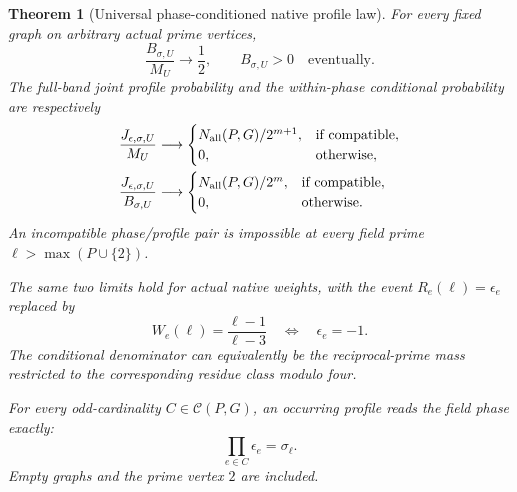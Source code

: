 \documentclass[11pt]{article}
\newtheorem{theorem}{Theorem}[section]
\begin{document}
\begin{theorem}[Universal phase-conditioned native profile law]
\label{thm:native-phase-profiles}
For every fixed graph on arbitrary actual prime vertices,
\[
 \frac{B_{\sigma,U}}{M_U}\longrightarrow\frac12,
 \qquad B_{\sigma,U}>0\quad\text{eventually}.
\]
The full-band joint profile probability and the within-phase
conditional probability are respectively
\begin{align}
 \frac{J_{\epsilon,\sigma,U}}{M_U}
 &\longrightarrow
 \begin{cases}
 N_{\rm all}(P,G)/2^{m+1},&\text{if compatible},\\
 0,&\text{otherwise},
 \end{cases}\label{eq:native-phase-joint}\\
 \frac{J_{\epsilon,\sigma,U}}{B_{\sigma,U}}
 &\longrightarrow
 \begin{cases}
 N_{\rm all}(P,G)/2^m,&\text{if compatible},\\
 0,&\text{otherwise}.
 \end{cases}\label{eq:native-phase-conditional}
\end{align}
An incompatible phase/profile pair is impossible at every field prime
\(\ell>\max(P\cup\{2\})\).

The same two limits hold for actual native weights, with the event
\(R_e(\ell)=\epsilon_e\) replaced by
\[
 W_e(\ell)=\frac{\ell-1}{\ell-3}
                   \quad\Longleftrightarrow\quad\epsilon_e=-1.
\]
The conditional denominator can equivalently be the reciprocal-prime
mass restricted to the corresponding residue class modulo four.

For every odd-cardinality \(C\in\mathcal C(P,G)\), an occurring profile
reads the field phase exactly:
\begin{equation}\label{eq:native-odd-cycle-readout}
 \prod_{e\in C}\epsilon_e=\sigma_\ell.
\end{equation}
Empty graphs and the prime vertex \(2\) are included.
\end{theorem}
\end{document}
